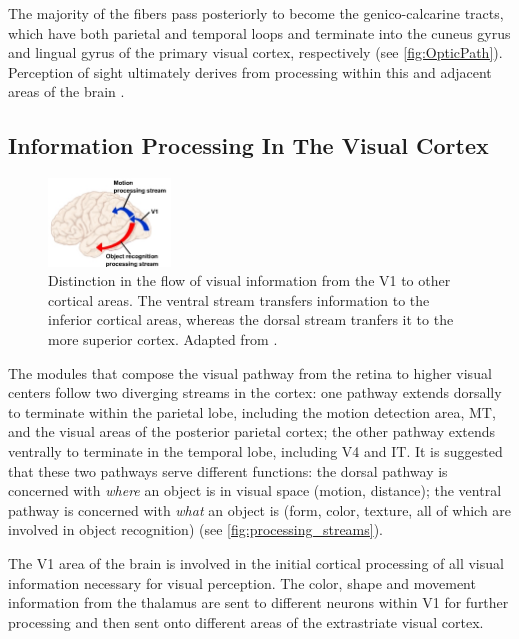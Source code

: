 The majority of the fibers pass posteriorly to become the genico-calcarine tracts, which have both parietal and temporal loops and terminate into the cuneus gyrus and lingual gyrus of the primary visual cortex, respectively (see \autoref{fig:OpticPath}). Perception of sight ultimately derives from processing within this and adjacent areas of the brain \cite{Gupta2022}.

\subsection{Information Processing In The Visual Cortex}

\begin{figure}
	\centering
	\includegraphics[width = 0.29\textwidth]{assets/images/Info_distinction_from_vis_cortex.jpg}
	\caption[Visual Information Flow Bifurcation]{Distinction in the flow of visual information from the \gls{V1} to other cortical areas. The ventral stream transfers information to the inferior cortical areas, whereas the dorsal stream tranfers it to the more superior cortex. Adapted from \cite{optic_nerve}. }
	\label{fig:processing_streams}
\end{figure}

The modules that compose the visual pathway from the retina to higher visual centers follow two diverging streams in the cortex: one pathway extends dorsally to terminate within the parietal lobe, including the motion detection area, \gls{MT}, and the visual areas of the posterior parietal cortex; the other pathway extends ventrally to terminate in the temporal lobe, including \gls{V4} and \gls{IT}. It is suggested \cite{Mishkin1983} that these two pathways serve different functions: the dorsal pathway is concerned with \textit{where} an object is in visual space (motion, distance); the ventral pathway is concerned with \textit{what} an object is (form, color, texture, all of which are involved in object recognition) (see \autoref{fig:processing_streams}).

The \gls{V1} area of the brain is involved in the initial cortical processing of all visual information necessary for visual perception. The color, shape and movement information from the thalamus are sent to different neurons within \gls{V1} for further processing and then sent onto different areas of the extrastriate visual cortex. 

